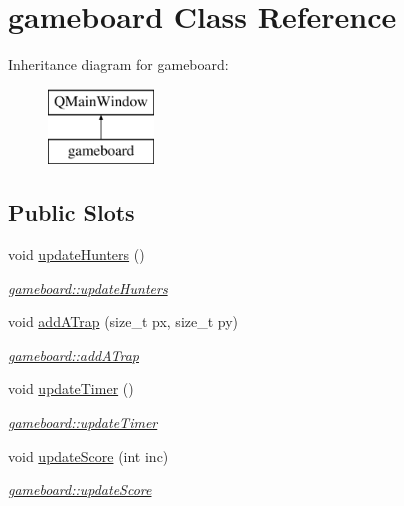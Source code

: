 \hypertarget{classgameboard}{}\section{gameboard Class Reference}
\label{classgameboard}
Inheritance diagram for gameboard\+:\begin{figure}[H]
\begin{center}
\leavevmode
\includegraphics[height=2.000000cm]{classgameboard}
\end{center}
\end{figure}
\subsection*{Public Slots}
\begin{DoxyCompactItemize}
\item 
void \hyperlink{classgameboard_aa93e61b0158eac1bb660a092b2ba60bf}{update\+Hunters} ()
\begin{DoxyCompactList}\small\item\em \hyperlink{classgameboard_aa93e61b0158eac1bb660a092b2ba60bf}{gameboard\+::update\+Hunters} \end{DoxyCompactList}\item 
void \hyperlink{classgameboard_a72c179788183077c7e923beee67a1a9f}{add\+A\+Trap} (size\+\_\+t px, size\+\_\+t py)
\begin{DoxyCompactList}\small\item\em \hyperlink{classgameboard_a72c179788183077c7e923beee67a1a9f}{gameboard\+::add\+A\+Trap} \end{DoxyCompactList}\item 
void \hyperlink{classgameboard_ade4b0bf8ebdbcf9eb42368db93e4640d}{update\+Timer} ()
\begin{DoxyCompactList}\small\item\em \hyperlink{classgameboard_ade4b0bf8ebdbcf9eb42368db93e4640d}{gameboard\+::update\+Timer} \end{DoxyCompactList}\item 
void \hyperlink{classgameboard_a6ad305d01f7d2e8845ddab6c873fe657}{update\+Score} (int inc)
\begin{DoxyCompactList}\small\item\em \hyperlink{classgameboard_a6ad305d01f7d2e8845ddab6c873fe657}{gameboard\+::update\+Score} \end{DoxyCompactList}\end{DoxyCompactItemize}
